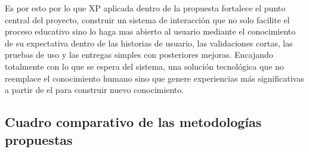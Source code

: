 \documentclass[pdflatex,sn-mathphys-num]{sn-jnl}%
\theoremstyle{thmstyleone}%
\theoremstyle{thmstyletwo}%
\theoremstyle{thmstylethree}%
\begin{document}
Es por esto por lo que XP aplicada dentro de la propuesta fortalece el punto central del proyecto, construir un sistema de interacción que no solo facilite el proceso educativo sino lo haga mas abierto al usuario mediante el conocimiento de su expectativa dentro de las historias de usuario, las validaciones cortas, las pruebas de uso y las entregas simples con posteriores mejoras. Encajando totalmente con lo que se espera del sistema, una solución tecnológica que no reemplace el conocimiento humano sino que genere experiencias más significativas a partir de el para construir nuevo conocimiento.


\subsection{Cuadro comparativo de las metodologías propuestas}
\FloatBarrier
\end{document}
